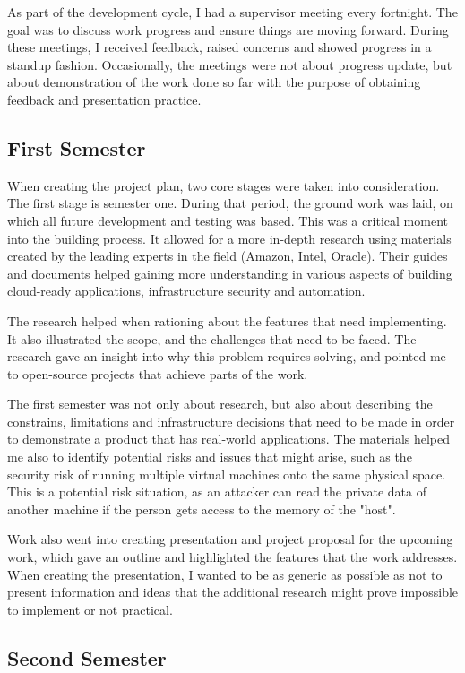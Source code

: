 \documentclass{article}
\begin{document}
As part of the development cycle, I had a supervisor meeting every fortnight. The goal was to discuss work progress and ensure things are moving forward. During these meetings, I received feedback, raised concerns and showed progress in a \gls{standup} fashion. Occasionally, the meetings were not about progress update, but about demonstration of the work done so far with the purpose of obtaining feedback and presentation practice.

\subsection{First Semester}
When creating the project plan, two core stages were taken into consideration. The first stage is semester one. During that period, the ground work was laid, on which all future development and testing was based. This was a critical moment into the building process. It allowed for a more in-depth research using materials created by the leading experts in the field (Amazon, Intel, Oracle). Their guides and documents helped gaining more understanding in various aspects of building cloud-ready applications, infrastructure security and automation.

The research helped when rationing about the features that need implementing. It also illustrated the scope, and the challenges that need to be faced. The research gave an insight into why this problem requires solving, and pointed me to open-source projects that achieve parts of the work.

The first semester was not only about research, but also about describing the constrains, limitations and infrastructure decisions that need to be made in order to demonstrate a  product that has real-world applications.
The materials helped me also to identify potential risks and issues that might arise, such as the security risk of running multiple virtual machines onto the same physical space. This is a potential risk situation, as an attacker can read the private data of another machine if the person gets access to the memory of the "host".

Work also went into creating presentation and project proposal for the upcoming work, which gave an outline and highlighted the features that the work addresses.
When creating the presentation, I wanted to be as generic as possible as not to present information and ideas that the additional research might prove impossible to implement or not practical.

\subsection{Second Semester}
\end{document}

